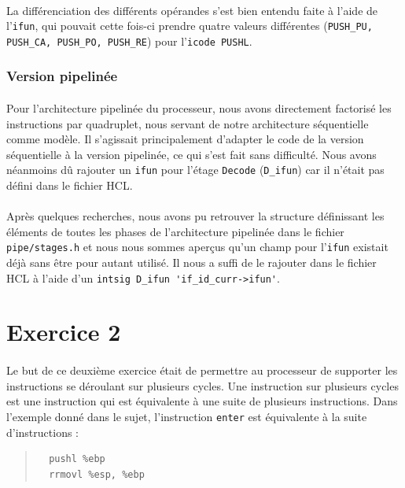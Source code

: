 \documentclass[12pt]{article}
\begin{document}
\paragraph{}La différenciation des différents opérandes s'est bien entendu faite à l'aide de l'\verb+ifun+, qui pouvait cette fois-ci prendre quatre valeurs différentes (\verb+PUSH_PU, PUSH_CA, PUSH_PO, PUSH_RE+) pour l'\verb+icode PUSHL+.

\subsubsection{Version pipelinée}
\paragraph{}Pour l'architecture pipelinée du processeur, nous avons directement factorisé les instructions par quadruplet, nous servant de notre architecture séquentielle comme modèle. Il s'agissait principalement d'adapter le code de la version séquentielle à la version pipelinée, ce qui s'est fait sans difficulté. Nous avons néanmoins dû rajouter un \verb+ifun+ pour l'étage \verb+Decode+ (\verb+D_ifun+) car il n'était pas défini dans le fichier HCL.

\paragraph{}Après quelques recherches, nous avons pu retrouver la structure définissant les éléments de toutes les phases de l'architecture pipelinée dans le fichier \verb+pipe/stages.h+ et nous nous sommes aperçus qu'un champ pour l'\verb+ifun+ existait déjà sans être pour autant utilisé. Il nous a suffi de le rajouter dans le fichier HCL à l'aide d'un \verb+intsig D_ifun 'if_id_curr->ifun'+.



\section{Exercice 2}
\paragraph{}Le but de ce deuxième exercice était de permettre au processeur de supporter les instructions se déroulant sur plusieurs cycles. Une instruction sur plusieurs cycles est une instruction qui est équivalente à une suite de plusieurs instructions. Dans l'exemple donné dans le sujet, l'instruction \verb+enter+ est équivalente à la suite d'instructions :
\begin{quote}
\begin{verbatim}
  pushl %ebp
  rrmovl %esp, %ebp
\end{verbatim}
\end{quote}
\end{document}
